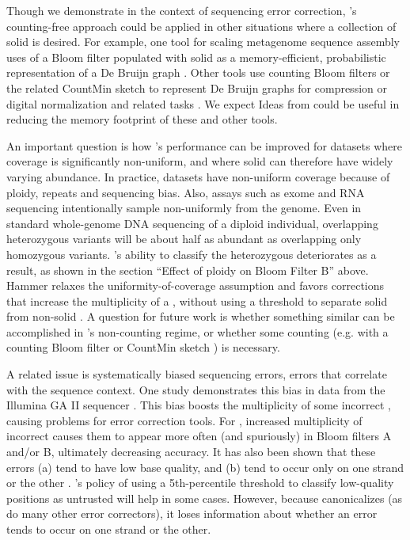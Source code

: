\documentclass{bmcart}
\begin{document}
Though we demonstrate \tool in the context of sequencing error correction, \tool's counting-free approach could be applied in other situations where a collection of solid \kmers is desired.
For example, one tool for scaling metagenome sequence assembly uses of a Bloom filter populated with solid \kmers as a memory-efficient, probabilistic representation of a De Bruijn graph \cite{pell2012scaling}.
Other tools use counting Bloom filters \cite{fan2000summary, bonomi2006improved} or the related CountMin sketch \cite{cormode2005improved} to represent De Bruijn graphs for compression \cite{jones2012compression} or digital normalization and related tasks \cite{zhang2013these}.
We expect Ideas from \tool could be useful in reducing the memory footprint of these and other tools.

An important question is how \tool's performance can be improved for datasets where coverage is significantly non-uniform, and where solid \kmers can therefore have widely varying abundance.
In practice, datasets have non-uniform coverage because of ploidy, repeats and sequencing bias.
Also, assays such as exome and RNA sequencing intentionally sample non-uniformly from the genome.
Even in standard whole-genome DNA sequencing of a diploid individual, \kmers overlapping heterozygous variants will be about half as abundant as \kmers overlapping only homozygous variants.
\tool's ability to classify the heterozygous \kmers deteriorates as a result, as shown in the section ``Effect of ploidy on Bloom Filter B'' above.
Hammer \cite{medvedev2011error} relaxes the uniformity-of-coverage assumption and favors corrections that increase the multiplicity of a \kmer, without using a threshold to separate solid from non-solid \kmers.
A question for future work is whether something similar can be accomplished in \tool's non-counting regime, or whether some counting (e.g. with a counting Bloom filter \cite{fan2000summary, bonomi2006improved} or CountMin sketch \cite{cormode2005improved}) is necessary.

A related issue is systematically biased sequencing errors, \thatis errors that correlate with the sequence context.
One study demonstrates this bias in data from the Illumina GA II sequencer \cite{nakamura2011sequence}.
This bias boosts the multiplicity of some incorrect \kmers, causing problems for error correction tools.
For \tool, increased multiplicity of incorrect \kmers causes them to appear more often (and spuriously) in Bloom filters A and/or B, ultimately decreasing accuracy.
It has also been shown that these errors (a) tend to have low base quality, and (b) tend to occur only on one strand or the other \cite{nakamura2011sequence}.
\tool's policy of using a 5th-percentile threshold to classify low-quality positions as untrusted will help in some cases.
However, because \tool canonicalizes \kmers (as do many other error correctors), it loses information about whether an error tends to occur on one strand or the other.
\end{document}
